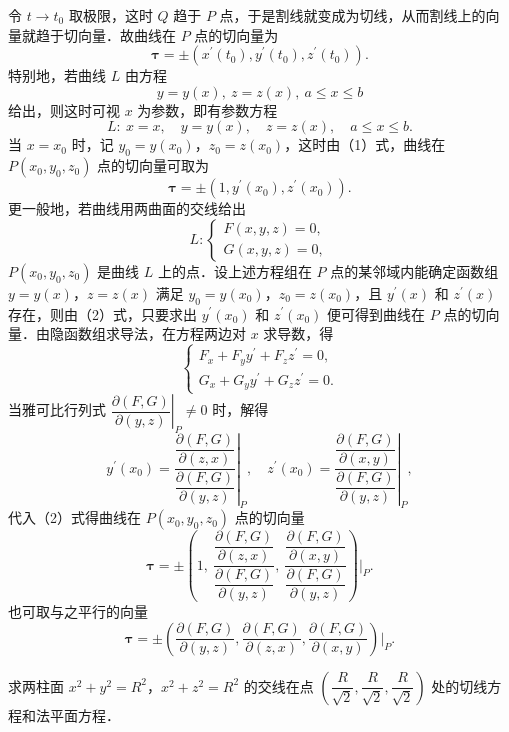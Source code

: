 令 $t\to t_{0}$ 取极限，这时 $Q$ 趋于 $P$ 点，于是割线就变成为切线，从而割线上的向量就趋于切向量．故曲线在 $P$ 点的切向量为
\begin{equation}
\bm{\tau}=\pm\left(x^{\prime}(t_{0}),y^{\prime}(t_{0}),z^{\prime}(t_{0})\right).
\tag{1}
\end{equation}
特别地，若曲线 $L$ 由方程
\[
y=y(x),\ z=z(x),\ a\leqslant x\leqslant b
\]
给出，则这时可视 $x$ 为参数，即有参数方程
\[
L\colon\ x=x,\quad y=y(x),\quad z=z(x),\quad a\leqslant x\leqslant b.
\]
当 $x=x_{0}$ 时，记 $y_{0}=y(x_{0})$，$z_{0}=z(x_{0})$，这时由（1）式，曲线在 $P(x_{0},y_{0},z_{0})$ 点的切向量可取为
\begin{equation}
\bm{\tau}=\pm\left(1,y^{\prime}(x_{0}),z^{\prime}(x_{0})\right).
\tag{2}
\end{equation}
更一般地，若曲线用两曲面的交线给出
\[
L\colon\begin{cases}
F(x,y,z)=0,\\
G(x,y,z)=0,
\end{cases}
\]
$P(x_{0},y_{0},z_{0})$ 是曲线 $L$ 上的点．设上述方程组在 $P$ 点的某邻域内能确定函数组 $y=y(x)$，$z=z(x)$ 满足 $y_{0}=y(x_{0})$，$z_{0}=z(x_{0})$，且 $y^{\prime}(x)$ 和 $z^{\prime}(x)$ 存在，则由（2）式，只要求出 $y^{\prime}(x_{0})$ 和 $z^{\prime}(x_{0})$ 便可得到曲线在 $P$ 点的切向量．由隐函数组求导法，在方程两边对 $x$ 求导数，得
\[
\begin{cases}
F_{x}+F_{y}y^{\prime}+F_{z}z^{\prime}=0,\\
G_{x}+G_{y}y^{\prime}+G_{z}z^{\prime}=0.
\end{cases}
\]
当雅可比行列式 $\left.\dfrac{\partial(F,G)}{\partial(y,z)}\right|_{P}\neq 0$ 时，解得
\[
y^{\prime}(x_{0})=\left.\frac{\dfrac{\partial(F,G)}{\partial(z,x)}}{\dfrac{\partial(F,G)}{\partial(y,z)}}\right|_{P},\quad z^{\prime}(x_{0})=\left.\frac{\dfrac{\partial(F,G)}{\partial(x,y)}}{\dfrac{\partial(F,G)}{\partial(y,z)}}\right|_{P},
\]
代入（2）式得曲线在 $P(x_{0},y_{0},z_{0})$ 点的切向量
\[
\bm{\tau}=\pm\left(1,\ \frac{\dfrac{\partial(F,G)}{\partial(z,x)}}{\dfrac{\partial(F,G)}{\partial(y,z)}},\ \frac{\dfrac{\partial(F,G)}{\partial(x,y)}}{\dfrac{\partial(F,G)}{\partial(y,z)}}\right)\bigg|_{P}.
\]
也可取与之平行的向量
\begin{equation}
\bm{\tau}=\pm\left(\frac{\partial(F,G)}{\partial(y,z)},\frac{\partial(F,G)}{\partial(z,x)},\frac{\partial(F,G)}{\partial(x,y)}\right)\bigg|_{P}.
\tag{3}
\end{equation}

\begin{example}\label{ex:16-3-1}
求两柱面 $x^{2}+y^{2}=R^{2}$，$x^{2}+z^{2}=R^{2}$ 的交线在点 $\left(\dfrac{R}{\sqrt{2}},\dfrac{R}{\sqrt{2}},\dfrac{R}{\sqrt{2}}\right)$ 处的切线方程和法平面方程．
\end{example}

